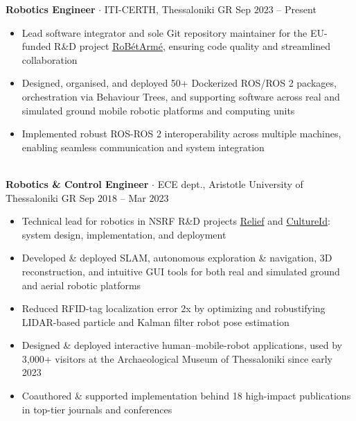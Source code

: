 \documentclass[a4paper,10pt,twoside]{article}
\begin{document}
  \noindent\textbf{Robotics Engineer} $\cdot$ ITI-CERTH, Thessaloniki GR \hfill {\small Sep $2023$ -- Present} \\
  \begin{minipage}[t]{\textwidth}
    \begin{itemize}
      \item Lead software integrator and sole Git repository maintainer for the EU-funded R\&D project \href{https://www.robetarme-project.eu/}{RoBétArmé}, ensuring code quality and streamlined collaboration\vspace{-0.8em}
      \item Designed, organised, and deployed 50+ Dockerized ROS/ROS 2 packages, orchestration via Behaviour Trees, and supporting software across real and simulated ground mobile robotic platforms and computing units\vspace{-0.8em}
      \item Implemented robust ROS-ROS 2 interoperability across multiple machines, enabling seamless communication and system integration
    \end{itemize}
  \end{minipage} \\[0.4em]

  \noindent\textbf{Robotics \& Control Engineer} $\cdot$ ECE dept., Aristotle University of Thessaloniki GR \hfill {\small Sep $2018$ -- Mar $2023$} \\
  \begin{minipage}[t]{\textwidth}
    \begin{itemize}
      \item Technical lead for robotics in NSRF R\&D projects \href{https://relief.web.auth.gr/language/en/home/}{Relief} and \href{https://cultureid.web.auth.gr/?page\_id=200&lang=en}{CultureId}: system design, implementation, and deployment \vspace{-0.8em}
      \item Developed \& deployed SLAM, autonomous exploration \& navigation, 3D reconstruction, and intuitive GUI tools for both real and simulated ground and aerial robotic platforms \vspace{-0.8em}
      \item Reduced RFID-tag localization error 2x by optimizing and robustifying LIDAR-based particle and Kalman filter robot pose estimation \vspace{-0.8em}
      \item Designed \& deployed interactive human--mobile-robot applications, used by 3,000+ visitors at the Archaeological Museum of Thessaloniki since early 2023 \vspace{-0.8em}
      \item Coauthored \& supported implementation behind 18 high-impact publications in top-tier journals and conferences
    \end{itemize}
  \end{minipage} \\[0.4em]
\end{document}
